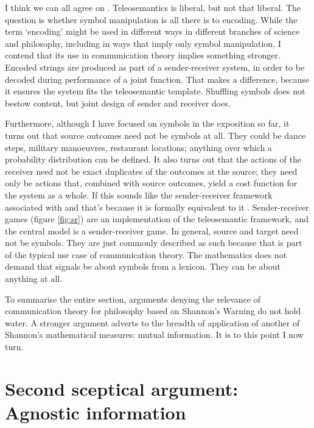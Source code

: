 \documentclass[12pt]{article}
\begin{document}
\noindent I think we can all agree on \smi{}.
Teleosemantics is liberal, but not that liberal.
The question is whether symbol manipulation is all there is to encoding.
While the term `encoding' might be used in different ways in different branches of science and philosophy, including in ways that imply only symbol manipulation, I contend that its use in communication theory implies something stronger.
Encoded strings are produced as part of a sender-receiver system, in order to be decoded during performance of a joint function.
That makes a difference, because it ensures the system fits the teleosemantic template.
Shuffling symbols does not bestow content, but joint design of sender and receiver does.

Furthermore, although I have focused on symbols in the exposition so far, it turns out that source outcomes need not be symbols at all.
They could be dance steps, military manoeuvres, restaurant locations; anything over which a probability distribution can be defined.
It also turns out that the actions of the receiver need not be exact duplicates of the outcomes at the source; they need only be actions that, combined with source outcomes, yield a cost function for the system as a whole.
If this sounds like the sender-receiver framework associated with \citet{skyrms2010signals} and \citet{lewis1969convention} that's because it is formally equivalent to it \citep{martinez2019deception}.
Sender-receiver games (figure \ref{fig:sr}) are an implementation of the teleosemantic framework, and the central model is a sender-receiver game.
In general, source and target need not be symbols.
They are just commonly described as such because that is part of the typical use case of communication theory.
The mathematics does not demand that signals be about symbols from a lexicon.
They can be about anything at all.



To summarise the entire section, arguments denying the relevance of communication theory for philosophy based on {\sc Shannon's Warning} do not hold water.
A stronger argument adverts to the breadth of application of another of Shannon's mathematical measures: mutual information.
It is to this point I now turn.


\section{Second sceptical argument: Agnostic information}\label{sec:agnostic}
\end{document}

